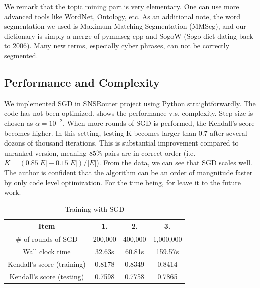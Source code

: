 \documentclass{sig-alternate}
\begin{document}
We remark that the topic mining part is very elementary. 
One can use more advanced tools like WordNet, Ontology, etc. 
As an additional note, the word segmentation we used is 
Maximum Matching Segmentation (MMSeg), and our dictionary is 
simply a merge of pymmseg-cpp and SogoW (Sogo dict dating back to 2006). 
Many new terms, especially cyber phrases, can not be correctly segmented. 

\subsection{Performance and Complexity}
\label{sec:Performance and Complexity}

We implemented SGD in SNSRouter project using Python straightforwardly. 
The code has not been optimized.
\rtbl{\ref{tbl:sgd_train}} shows the performance v.s. complexity. 
Step size is chosen as $\alpha = 10^{-2}$. 
When more rounds of SGD is performed, the Kendall's score becomes higher. 
In this setting, testing K becomes larger than $0.7$ after 
several dozons of thousand iterations. 
This is substantial improvement compared to unranked version, 
meaning $85\%$ pairs are in correct order 
(i.e. $K = (0.85 |E| - 0.15 |E|) / |E|$). 
From the data, we can see that SGD scales well. 
The author is confident that the algorithm can be 
an order of mangnitude faster by only code level optimization. 
For the time being, for leave it to the future work. 

\begin{table}[htb]
	\centering
	\caption{Training with SGD}
	\label{tbl:sgd_train}
	\begin{tabular}{c|c|c|c}
	\hline
	Item & 1. & 2. & 3. \\
	\hline
	\# of rounds of SGD & 200,000 & 400,000 & 1,000,000\\
	Wall clock time & 32.63s & 60.81s & 159.57s\\
	Kendall's score (training) & 0.8178 & 0.8349 & 0.8414\\
	Kendall's score (testing) & 0.7598 & 0.7758 & 0.7865\\
	\hline
	\end{tabular}
\end{table}
\end{document}
